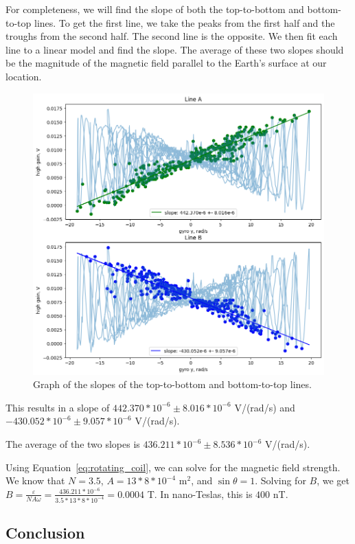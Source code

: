 \documentclass[11pt]{article}
\begin{document}
    For completeness, we will find the slope of both the top-to-bottom and bottom-to-top lines.
    To get the first line, we take the peaks from the first half and the troughs from the second half.
    The second line is the opposite.
    We then fit each line to a linear model and find the slope.
    The average of these two slopes should be the magnitude of the magnetic field parallel to the Earth's surface at our location.

    \begin{figure}[H]
        \centering
        \includegraphics[width=0.8\linewidth]{resources/images/part 1 slopes}
        \caption{Graph of the slopes of the top-to-bottom and bottom-to-top lines.}
        \label{fig:part_1_slopes}
    \end{figure}

    This results in a slope of $442.370*10^{-6} \pm 8.016*10^{-6}$ V/(rad/s) and $-430.052*10^{-6} \pm 9.057*10^{-6}$ V/(rad/s).

    The average of the two slopes is $436.211*10^{-6} \pm 8.536*10^{-6}$ V/(rad/s).

    Using Equation~\ref{eq:rotating_coil}, we can solve for the magnetic field strength.
    We know that $N = 3.5$, $A = 13*8*10^{-4}$ m$^2$, and $\sin\theta = 1$.
    Solving for $B$, we get $B = \frac{\varepsilon}{N A \omega} = \frac{436.211*10^{-6}}{3.5*13*8*10^{-4}} = 0.0004$ T.
    In nano-Teslas, this is $400$ nT.



    \subsection{Conclusion}\label{subsec:part_1_conclusion}
\end{document}
